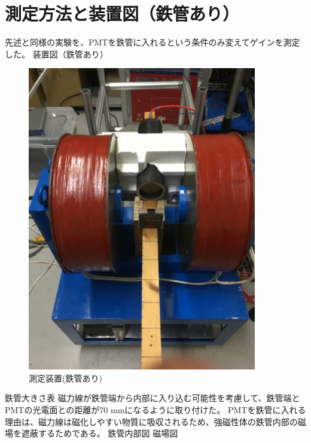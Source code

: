 \section{測定方法と装置図（鉄管あり）}
先述と同様の実験を、PMTを鉄管に入れるという条件のみ変えてゲインを測定した。
装置図（鉄管あり）
\begin{figure}[H]
	\centering
		\includegraphics[width=10cm]{fig/iguchi/2inchinFe.jpg}
	\caption{測定装置(鉄管あり)}
	\label{2inchinFe}
\end{figure}

鉄管大きさ表
磁力線が鉄管端から内部に入り込む可能性を考慮して、鉄管端とPMTの光電面との距離が70 mmになるように取り付けた。
PMTを鉄管に入れる理由は、磁力線は磁化しやすい物質に吸収されるため、強磁性体の鉄管内部の磁場を遮蔽するためである。
鉄管内部図
磁場図

